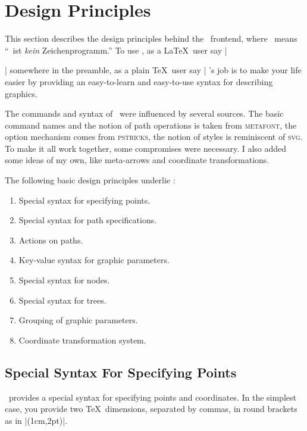 %
%
%

\section{Design Principles}

This section describes the design principles behind the \tikzname\
frontend, where \tikzname\ means ``\tikzname\ ist \emph{kein}
Zeichenprogramm.'' To use \tikzname, as a \LaTeX\ user say
|\usepackage{tikz}| somewhere in the preamble, as a plain \TeX\ user
say | \tikzname's job is to make your life easier by
providing an easy-to-learn and easy-to-use syntax for describing
graphics. 

The commands and syntax of \tikzname\ were influenced by several
sources. The basic command names and the notion of  path operations is
taken from \textsc{metafont}, the option mechanism comes from
\textsc{pstricks}, the notion of styles is reminiscent of
\textsc{svg}. To make it all work together, some compromises were
necessary. I also added some ideas of my own, like meta-arrows and
coordinate transformations. 

The following basic design principles underlie \tikzname:
\begin{enumerate}
\item Special syntax for specifying points.
\item Special syntax for path specifications.
\item Actions on paths.
\item Key-value syntax for graphic parameters.
\item Special syntax for nodes.
\item Special syntax for trees.
\item Grouping of graphic parameters.
\item Coordinate transformation system.
\end{enumerate}



\subsection{Special Syntax For Specifying Points}

\tikzname\ provides a special syntax for specifying points and
coordinates. In the simplest case, you provide two \TeX\ dimensions,
separated by commas, in round brackets as in |(1cm,2pt)|.

